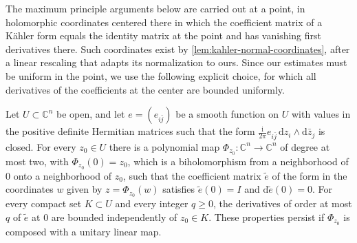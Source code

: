 The maximum principle arguments below are carried out at a point, in holomorphic coordinates centered there in which the coefficient matrix of a K\"ahler form equals the identity matrix at the point and has vanishing first derivatives there. Such coordinates exist by \cref{lem:kahler-normal-coordinates}, after a linear rescaling that adapts its normalization to ours. Since our estimates must be uniform in the point, we use the following explicit choice, for which all derivatives of the coefficients at the center are bounded uniformly.

\begin{lemma}\label{lem:kahler-normal-coordinates-uniform}
Let $U\subset\mathbb C^n$ be open, and let $e=(e_{i\bar j})$ be a smooth function on $U$ with values in the positive definite Hermitian matrices such that the form $\frac{\mathrm i}{2\pi}e_{i\bar j}\,\mathrm dz_i\wedge\mathrm d\bar z_j$ is closed. For every $z_0\in U$ there is a polynomial map $\Phi_{z_0}\colon\mathbb C^n\to\mathbb C^n$ of degree at most two, with $\Phi_{z_0}(0)=z_0$, which is a biholomorphism from a neighborhood of $0$ onto a neighborhood of $z_0$, such that the coefficient matrix $\tilde e$ of the form in the coordinates $w$ given by $z=\Phi_{z_0}(w)$ satisfies $\tilde e(0)=I$ and $\mathrm d\tilde e(0)=0$. For every compact set $K\subset U$ and every integer $q\geq0$, the derivatives of order at most $q$ of $\tilde e$ at $0$ are bounded independently of $z_0\in K$. These properties persist if $\Phi_{z_0}$ is composed with a unitary linear map.
\end{lemma}
